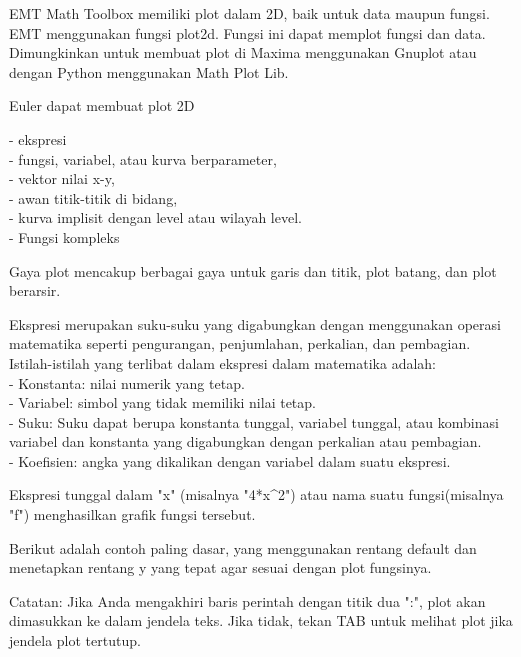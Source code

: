 \begin{eulernotebook}
\begin{eulercomment}
EMT Math Toolbox memiliki plot dalam 2D, baik untuk data maupun
fungsi. EMT menggunakan fungsi plot2d. Fungsi ini dapat memplot fungsi
dan data.\\
Dimungkinkan untuk membuat plot di Maxima menggunakan Gnuplot atau
dengan Python menggunakan Math Plot Lib.

Euler dapat membuat plot 2D

- ekspresi\\
- fungsi, variabel, atau kurva berparameter,\\
- vektor nilai x-y,\\
- awan titik-titik di bidang,\\
- kurva implisit dengan level atau wilayah level.\\
- Fungsi kompleks

Gaya plot mencakup berbagai gaya untuk garis dan titik, plot batang,
dan plot berarsir.\\

\end{eulercomment}

\begin{eulercomment}
Ekspresi merupakan suku-suku yang digabungkan dengan menggunakan
operasi matematika seperti pengurangan, penjumlahan, perkalian, dan
pembagian.\\
Istilah-istilah yang terlibat dalam ekspresi dalam matematika adalah:\\
- Konstanta: nilai numerik yang tetap.\\
- Variabel: simbol yang tidak memiliki nilai tetap.\\
- Suku: Suku dapat berupa konstanta tunggal, variabel tunggal, atau
kombinasi variabel dan konstanta yang digabungkan dengan perkalian
atau pembagian.\\
- Koefisien: angka yang dikalikan dengan variabel dalam suatu
ekspresi.

Ekspresi tunggal dalam "x" (misalnya "4*x\textasciicircum{}2") atau nama suatu
fungsi(misalnya "f") menghasilkan grafik fungsi tersebut.

Berikut adalah contoh paling dasar, yang menggunakan rentang default
dan menetapkan rentang y yang tepat agar sesuai dengan plot fungsinya.

Catatan: Jika Anda mengakhiri baris perintah dengan titik dua ":",
plot akan dimasukkan ke dalam jendela teks. Jika tidak, tekan TAB
untuk melihat plot jika jendela plot tertutup.


\end{eulercomment}
\end{eulernotebook}

